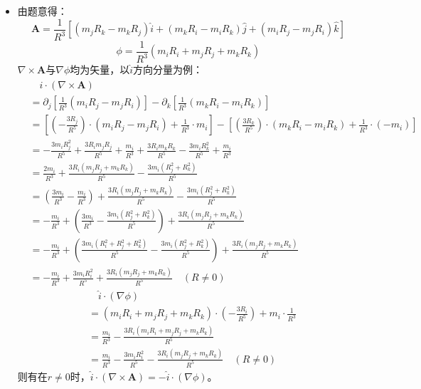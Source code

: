 \documentclass[a4paper,fontset=none]{ctexart}
\begin{document}
\begin{itemize}
        \item[6.]
        由题意得：
        \[
            \bm{A} = \frac{1}{R^3}\left[(m_j R_k - m_k R_j)\hat{i} + (m_k R_i - m_i R_k)\hat{j} + (m_i R_j - m_j R_i)\hat{k}\right]
        \]
        \[
            \phi = \frac{1}{R^3}(m_i R_i + m_j R_j + m_k R_k)
        \]
        $\nabla\times\bm{A}$与$\nabla\phi$均为矢量，以$\hat{i}$方向分量为例：
        \begin{align*}
            &\quad \hat{i}\cdot(\nabla\times\bm{A}) \\
            &= \partial_j\left[\frac{1}{R^3}(m_i R_j - m_j R_i)\right] - \partial_k\left[\frac{1}{R^3}(m_k R_i - m_i R_k)\right] \\
            &= \left[\left(-\frac{3R_j}{R^5}\right)\cdot(m_i R_j - m_j R_i) + \frac{1}{R^3}\cdot m_i\right] - \left[\left(\frac{3R_k}{R^5}\right)\cdot(m_k R_i - m_i R_k) + \frac{1}{R^3}\cdot(-m_i)\right] \\
            &= -\frac{3m_i R_j^2}{R^5} + \frac{3R_i m_j R_j}{R^5} + \frac{m_i}{R^3} + \frac{3R_i m_k R_k}{R^5} - \frac{3m_i R_k^2}{R^5} + \frac{m_i}{R^3} \\
            &= \frac{2m_i}{R^3} + \frac{3R_i(m_j R_j + m_k R_k)}{R^5} - \frac{3m_i(R_j^2 + R_k^2)}{R^5} \\
            &= \left(\frac{3m_i}{R^3} - \frac{m_i}{R^3}\right) + \frac{3R_i(m_j R_j + m_k R_k)}{R^5} - \frac{3m_i(R_j^2 + R_k^2)}{R^5} \\
            &= -\frac{m_i}{R^3} + \left(\frac{3m_i}{R^3} - \frac{3m_i(R_j^2 + R_k^2)}{R^5}\right) + \frac{3R_i(m_j R_j + m_k R_k)}{R^5} \\
            &= -\frac{m_i}{R^3} + \left(\frac{3m_i(R_i^2 + R_j^2 + R_k^2)}{R^5} - \frac{3m_i(R_j^2 + R_k^2)}{R^5}\right) + \frac{3R_i(m_j R_j + m_k R_k)}{R^5} \\
            &= -\frac{m_i}{R^3} + \frac{3m_i R_i^2}{R^5} + \frac{3R_i(m_j R_j + m_k R_k)}{R^5} \quad(R \neq 0)
        \end{align*}
        \begin{align*}
            &\quad \hat{i}\cdot(\nabla\phi) \\
            &= (m_i R_i + m_j R_j + m_k R_k)\cdot\left(-\frac{3R_i}{R^5}\right) + m_i\cdot\frac{1}{R^3} \\
            &= \frac{m_i}{R^3} - \frac{3R_i(m_i R_i + m_j R_j + m_k R_k)}{R^5} \\
            &= \frac{m_i}{R^3} - \frac{3m_i R_i^2}{R^5} - \frac{3R_i(m_j R_j + m_k R_k)}{R^5} \quad(R \neq 0)
        \end{align*}
        则有在$r \neq 0$时，$\hat{i}\cdot(\nabla\times\bm{A}) = -\hat{i}\cdot(\nabla\phi)$。


\end{itemize}
\end{document}

